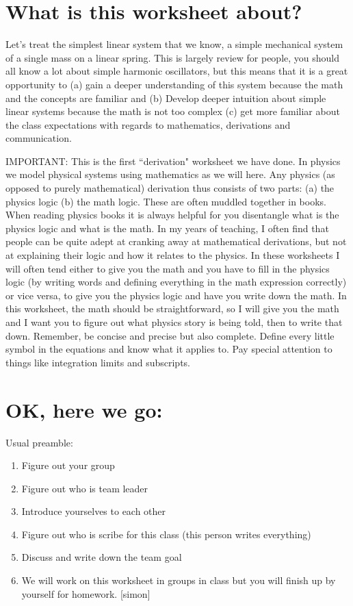 \documentclass[]{revtex4}
\begin{document}
\section*{What is this worksheet about?}
Let's treat the simplest linear system that we know, a simple mechanical system of a single mass on a linear spring.  This is largely review for people, you should all know a lot about simple harmonic oscillators, but this means that it is a great opportunity to (a) gain a deeper understanding of this system because the math and the concepts are familiar and (b) Develop deeper intuition about simple linear systems because the math is not too complex (c) get more familiar about the class expectations with regards to mathematics, derivations and communication.

IMPORTANT: This is the first ``derivation" worksheet we have done.  In physics we model physical systems using mathematics as we will here.  Any physics (as opposed to purely mathematical) derivation thus consists of two parts: (a) the physics logic (b) the math logic.  These are often muddled together in books.  When reading physics books it is always helpful for you disentangle what is the physics logic and what is the math.  In my years of teaching, I often find that people can be quite adept at cranking away at mathematical derivations, but not at explaining their logic and how it relates to the physics.  In these worksheets I will often tend either to give you the math and you have to fill in the physics logic (by writing words and defining everything in the math expression correctly) or vice versa, to give you the physics logic and have you write down the math. In this worksheet, the math should be straightforward, so I will give you the math and I want you to figure out what physics story is being told, then to write that down.  Remember, be concise and precise but also complete.  Define every little symbol in the equations and know what it applies to.  Pay special attention to things like integration limits and subscripts.


\section*{OK, here we go:}
Usual preamble:
\begin{enumerate}
  \item Figure out your group
  \item Figure out who is team leader
  \item Introduce yourselves to each other
  \item Figure out who is scribe for this class (this person writes everything)
  \item Discuss and write down the team goal
  \item We will work on this worksheet in groups in class but you will finish up by yourself for homework.  [simon]
\end{enumerate}
\end{document}
